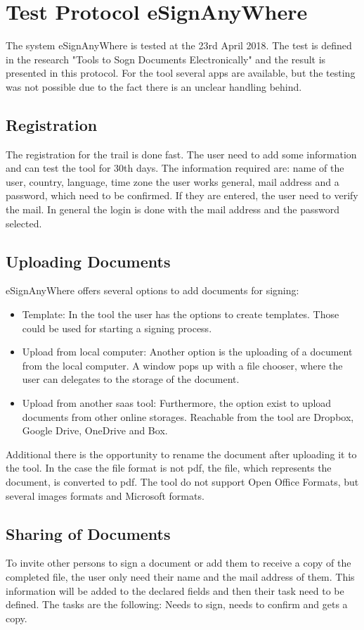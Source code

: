\section{Test Protocol eSignAnyWhere}
\label{sec:signAny}
The system eSignAnyWhere is tested at the 23rd April 2018. The test is defined in the research "Tools to Sogn Documents Electronically" and the result is presented in this protocol. For the tool several \glspl{app} are available, but the testing was not possible due to the fact there is an unclear handling behind.

\subsection{Registration}
The registration for the trail is done fast. The user need to add some information and can test the tool for 30th days. The information required are: name of the user, country, language, time zone the user works general, mail address and a password, which need to be confirmed. If they are entered, the user need to verify the mail.
In general the login is done with the mail address and the password selected.

\subsection{Uploading Documents}
eSignAnyWhere offers several options to add documents for signing:
\begin{itemize}
	\item Template: In the tool the user has the options to create templates. Those could be used for starting a signing process.
	\item Upload from local computer: Another option is the uploading of a document from the local computer. A window pops up with a file chooser, where the user can delegates to the storage of the document. 
	\item Upload from another \gls{saas} tool: Furthermore, the option exist to upload documents from other online storages. Reachable from the tool are Dropbox, Google Drive, OneDrive and Box.
\end{itemize}
Additional there is the opportunity to rename the document after uploading it to the tool. In the case the file format is not \gls{pdf}, the file, which represents the document, is converted to \gls{pdf}. The tool do not support Open Office Formats, but several images formats and Microsoft formats.

\subsection{Sharing of Documents}
To invite other persons to sign a document or add them to receive a copy of the completed file, the user only need their name and the mail address of them. This information will be added to the declared fields and then their task need to be defined. The tasks are the following: Needs to sign, needs to confirm and gets a copy.

